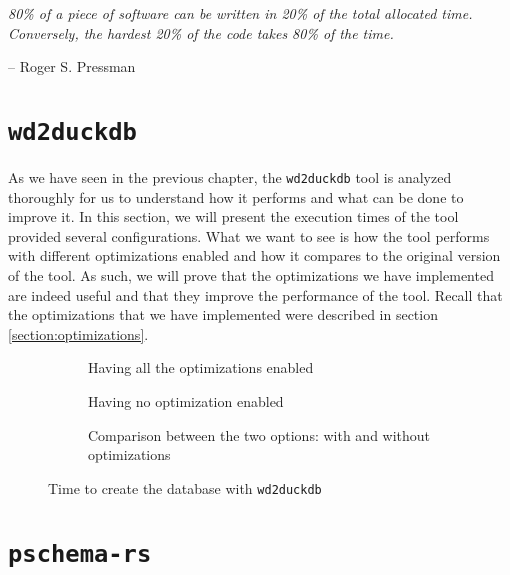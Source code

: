 \epigraph{\textit{80\% of a piece of software can be written in 20\% of the total allocated time. Conversely, the hardest 20\% of the code takes 80\% of the time.}}{-- \textup{Roger S. Pressman}}

\section{\texttt{wd2duckdb}}

As we have seen in the previous chapter, the \texttt{wd2duckdb} tool is analyzed thoroughly for us to understand how it performs and what can be done to improve it. In this section, we will present the execution times of the tool provided several configurations. What we want to see is how the tool performs with different optimizations enabled and how it compares to the original version of the tool. As such, we will prove that the optimizations we have implemented are indeed useful and that they improve the performance of the tool. Recall that the optimizations that we have implemented were described in section \ref{section:optimizations}.

\begin{figure}[p]
    \begin{subfigure}{0.49\textwidth}
        \centering
        
        \caption{Having all the optimizations enabled}
    \end{subfigure}%
    \hfill
    \begin{subfigure}{0.49\textwidth}
        \centering
        
        \caption{Having no optimization enabled}
    \end{subfigure}%
    \vspace*{1em}
    \begin{subfigure}{\textwidth}
        \centering
        
        \caption{Comparison between the two options: with and without optimizations}
    \end{subfigure}
    \caption{Time to create the database with \texttt{wd2duckdb}}
\end{figure}


\section{\texttt{pschema-rs}}
